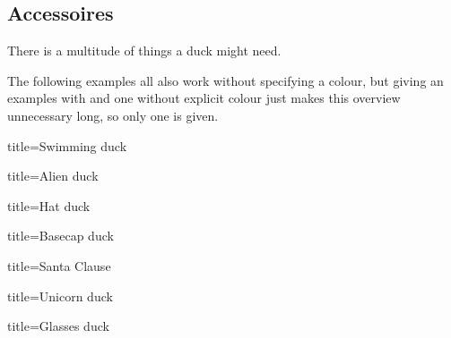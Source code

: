 \documentclass[parskip=half]{scrartcl}
\begin{document}
\subsection{Accessoires}

There is a multitude of things a duck might need. 

The following examples all also work without specifying a colour, but giving an examples with and one without explicit colour just makes this overview unnecessary long, so only one is given.

\begin{tcblisting}{title={Swimming duck}}
\begin{tikzpicture}
	\duck[water=cyan!50!blue]
\end{tikzpicture}
\end{tcblisting}

\begin{tcblisting}{title={Alien duck}}
\begin{tikzpicture}
	\duck[alien=green!50!brown]
\end{tikzpicture}
\end{tcblisting}

\begin{tcblisting}{title={Hat duck}}
\begin{tikzpicture}
	\duck[hat=red!50!black]
\end{tikzpicture}
\end{tcblisting}

\begin{tcblisting}{title={Basecap duck}}
\begin{tikzpicture}
	\duck[cap=red!80!black]
\end{tikzpicture}
\end{tcblisting}

\begin{tcblisting}{title={Santa Clause}}
\begin{tikzpicture}
	\duck[santa=red!80!black]
\end{tikzpicture}
\end{tcblisting}

\begin{tcblisting}{title={Unicorn duck}}
\begin{tikzpicture}
	\duck[body=pink,
		unicorn=magenta!60!violet,
		longhair=magenta!60!violet]
\end{tikzpicture}
\end{tcblisting}

\begin{tcblisting}{title={Glasses duck}}
\begin{tikzpicture}
	\duck[glasses=red!50!black]
\end{tikzpicture}
\end{tcblisting}
\end{document}
